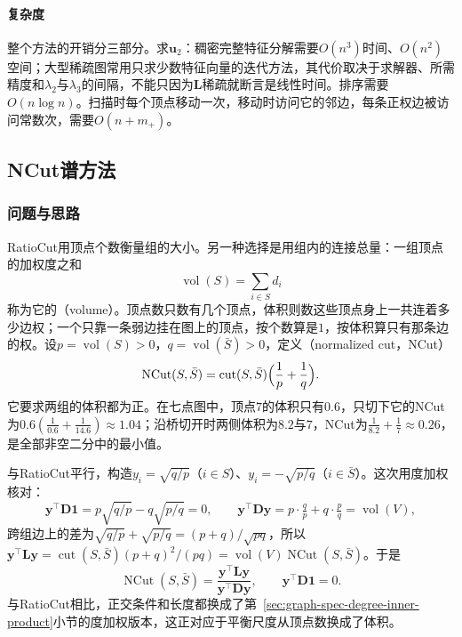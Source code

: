 \paragraph{复杂度}
整个方法的开销分三部分。求$\bm u_2$：稠密完整特征分解需要$O(n^3)$时间、$O(n^2)$空间；大型稀疏图常用只求少数特征向量的迭代方法，其代价取决于求解器、所需精度和$\lambda_2$与$\lambda_3$的间隔，不能只因为$\bm L$稀疏就断言是线性时间。排序需要$O(n\log n)$。扫描时每个顶点移动一次，移动时访问它的邻边，每条正权边被访问常数次，需要$O(n+m_+)$。

\subsection{NCut谱方法}
\label{sec:graph-spec-normalized-cut}

\subsubsection{问题与思路}

RatioCut用顶点个数衡量组的大小。另一种选择是用组内的连接总量：一组顶点的加权度之和
\[
 \operatorname{vol}(S)=\sum_{i\in S}d_i
\]
称为它的（volume）。顶点数只数有几个顶点，体积则数这些顶点身上一共连着多少边权；一个只靠一条弱边挂在图上的顶点，按个数算是$1$，按体积算只有那条边的权。设$p=\operatorname{vol}(S)>0$，$q=\operatorname{vol}(\bar S)>0$，定义（normalized cut，NCut）
\begin{equation}
 \operatorname{NCut}(S,\bar S)=\operatorname{cut}(S,\bar S)\Bigl(\frac1p+\frac1q\Bigr).
 \label{eq:graph-spec-normalized-cut}
\end{equation}
它要求两组的体积都为正。在七点图中，顶点$7$的体积只有$0.6$，只切下它的NCut为$0.6(\tfrac1{0.6}+\tfrac1{14.6})\approx1.04$；沿桥切开时两侧体积为$8.2$与$7$，NCut为$\tfrac1{8.2}+\tfrac17\approx0.26$，是全部非空二分中的最小值。

与RatioCut平行，构造$y_i=\sqrt{q/p}$（$i\in S$）、$y_i=-\sqrt{p/q}$（$i\in\bar S$）。这次用度加权核对：
\[
 \bm y^{\top}\bm D\bm1=p\sqrt{q/p}-q\sqrt{p/q}=0,\qquad
 \bm y^{\top}\bm D\bm y=p\cdot\tfrac qp+q\cdot\tfrac pq=\operatorname{vol}(V),
\]
跨组边上的差为$\sqrt{q/p}+\sqrt{p/q}=(p+q)/\sqrt{pq}$，所以$\bm y^{\top}\bm L\bm y=\operatorname{cut}(S,\bar S)(p+q)^2/(pq)=\operatorname{vol}(V)\operatorname{NCut}(S,\bar S)$。于是
\[
 \operatorname{NCut}(S,\bar S)=\frac{\bm y^{\top}\bm L\bm y}{\bm y^{\top}\bm D\bm y},\qquad \bm y^{\top}\bm D\bm1=0 .
\]
与RatioCut相比，正交条件和长度都换成了第~\ref{sec:graph-spec-degree-inner-product}小节的度加权版本，这正对应于平衡尺度从顶点数换成了体积。

